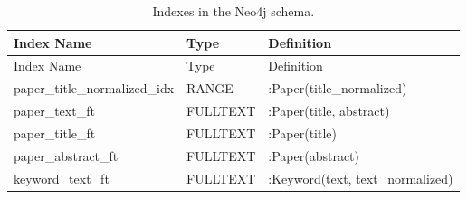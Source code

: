 \documentclass{llmxive}
\begin{document}
{
\begin{longtable}{@{}p{5.6cm}p{1.7cm}p{5.8cm}@{}}
\caption{Indexes in the Neo4j schema.}
\label{tab:indexes-general} \\

\toprule
{ Index Name\par} & { Type\par} & { Definition\par} \\
\midrule
\endfirsthead

\toprule
{ Index Name\par} & { Type\par} & { Definition\par} \\
\midrule
\endhead

\bottomrule
\endfoot

{ paper\_\allowbreak title\_\allowbreak normalized\_\allowbreak idx\par} & RANGE & { :Paper(title\_normalized)\par} \\
{ paper\_\allowbreak text\_\allowbreak ft\par} & FULLTEXT & { :Paper(title, abstract)\par} \\
{ paper\_\allowbreak title\_\allowbreak ft\par} & FULLTEXT & { :Paper(title)\par} \\
{ paper\_\allowbreak abstract\_\allowbreak ft\par} & FULLTEXT & { :Paper(abstract)\par} \\
{ keyword\_\allowbreak text\_\allowbreak ft\par} & FULLTEXT & { :Keyword(text, text\_normalized)\par} \\

\end{longtable}
}
\end{document}
